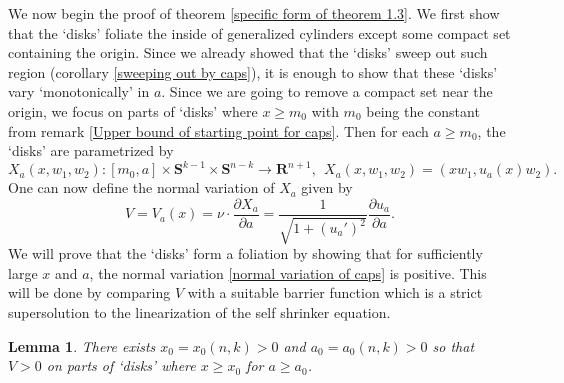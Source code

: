 \documentclass[pdflatex,sn-mathphys-num]{sn-jnl}
\newtheorem{lemma}[theorem]{Lemma}
\begin{document}
We now begin the proof of theorem \ref{specific form of theorem 1.3}. We first show that the `disks' foliate the inside of generalized cylinders except some compact set containing the origin. Since we already showed that the `disks' sweep out such region (corollary \ref{sweeping out by caps}), it is enough to show that these `disks' vary `monotonically' in $a$. Since we are going to remove a compact set near the origin, we focus on parts of `disks' where $x \geq m_0$ with $m_0$ being the constant from remark \ref{Upper bound of starting point for caps}. Then for each $a \geq m_0$, the `disks' are parametrized by
$$X_a(x, w_1, w_2) : [m_0, a] \times \mathbf{S}^{k-1} \times \mathbf{S}^{n-k} \to \mathbf{R}^{n+1}, \ \ X_a(x,w_1, w_2) = (xw_1, u_a(x)w_2).$$
One can now define the normal variation of $X_a$ given by
\begin{equation}\label{normal variation of caps}
  V = V_a(x) = \nu \cdot \frac{\partial X_a}{\partial a} = \frac{1}{\sqrt{1 + (u_a')^2}}\frac{\partial u_a}{\partial a}.  
\end{equation}
We will prove that the `disks' form a foliation by showing that for sufficiently large $x$ and $a$, the normal variation \eqref{normal variation of caps} is positive. This will be done by comparing $V$ with a suitable barrier function which is a strict supersolution to the linearization of the self shrinker equation. 
\begin{lemma}\label{injectivity of caps}
    There exists $x_0 = x_0(n,k) > 0$ and $a_0 = a_0(n,k) > 0$ so that $V > 0$ on parts of `disks' where $x \geq x_0$ for $a \geq a_0$.
\end{lemma}
\end{document}
